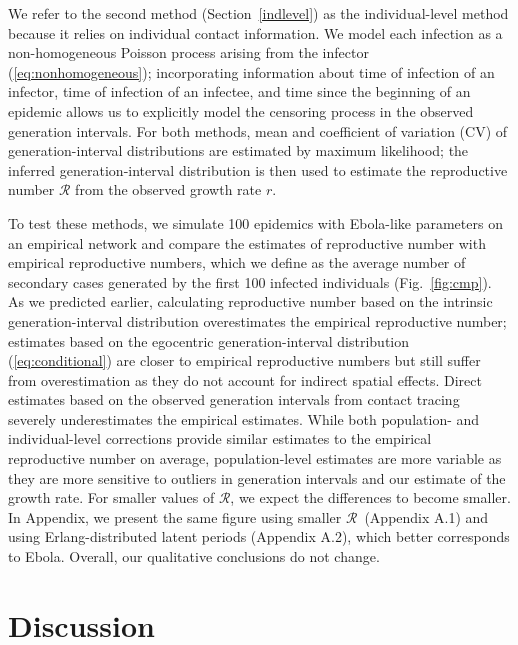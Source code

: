 \documentclass[12pt]{article}
\newcommand{\eref}[1]{(\ref{eq:#1})}
\newcommand{\fref}[1]{Fig.~\ref{fig:#1}}
\newcommand{\RR}{\ensuremath{{\mathcal R}}}
\begin{document}
We refer to the second method (Section~\ref{indlevel}) as the individual-level method because it relies on individual contact information.
We model each infection as a non-homogeneous Poisson process arising from the infector \eref{nonhomogeneous}; 
incorporating information about time of infection of an infector, time of infection of an infectee, and time since the beginning of an epidemic allows us to explicitly model the censoring process in the observed generation intervals.
For both methods, mean and coefficient of variation (CV) of generation-interval distributions are estimated by maximum likelihood; the inferred generation-interval distribution is then used to estimate the reproductive number $\RR$ from the observed growth rate $r$.

To test these methods, we simulate 100 epidemics with Ebola-like parameters on an empirical network \citep{leskovec2016snap}
and compare the estimates of reproductive number with empirical reproductive numbers, which we define as the average number of secondary cases generated by the first 100 infected individuals (\fref{cmp}).
As we predicted earlier, calculating reproductive number based on the intrinsic generation-interval distribution overestimates the empirical reproductive number;
estimates based on the egocentric generation-interval distribution \eref{conditional} are closer to empirical reproductive numbers but still suffer from overestimation as they do not account for indirect spatial effects. Direct estimates based on the observed generation intervals from contact tracing severely underestimates the empirical estimates.
While both population- and individual-level corrections provide similar estimates to the empirical reproductive number on average,
population-level estimates are more variable as they are more sensitive to outliers in generation intervals and our estimate of the growth rate.
For smaller values of \RR, we expect the differences to become smaller.
In Appendix, we present the same figure using smaller \RR\ (Appendix A.1) and using Erlang-distributed latent periods (Appendix A.2), which better corresponds to Ebola.
Overall, our qualitative conclusions do not change.

\section{Discussion}
\end{document}
